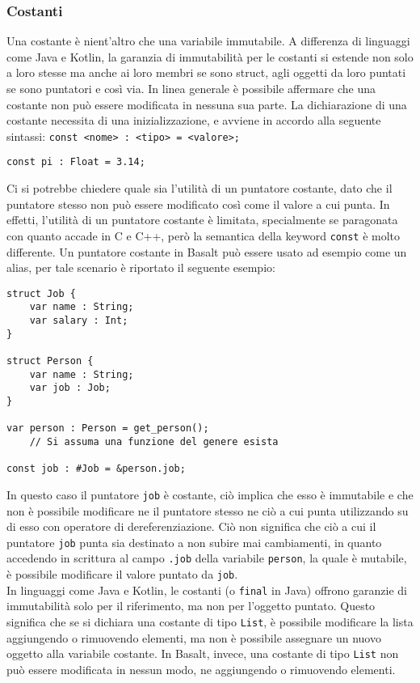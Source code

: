 \subsubsection{Costanti}
Una costante è nient'altro che una variabile immutabile. A differenza di linguaggi come Java e Kotlin, la garanzia di immutabilità per le costanti
si estende non solo a loro stesse ma anche ai loro membri se sono struct, agli oggetti da loro puntati se sono puntatori e così via. In linea generale
è possibile affermare che una costante non può essere modificata in nessuna sua parte. La dichiarazione di una costante necessita di una inizializzazione, 
e avviene in accordo alla seguente sintassi: \texttt{const <nome> : <tipo> = <valore>;}

\vspace{0.5cm}
\begin{lstlisting}[frame=single]
const pi : Float = 3.14;
\end{lstlisting}
\vspace{0.5cm}

Ci si potrebbe chiedere quale sia l'utilità di un puntatore costante, dato che il puntatore stesso non può essere modificato così come il valore a cui punta.
In effetti, l'utilità di un puntatore costante è limitata, specialmente se paragonata con quanto accade in C e C++, però la semantica della keyword \texttt{const}
è molto differente. Un puntatore costante in Basalt può essere usato ad esempio come un alias, per tale scenario è riportato il seguente esempio:

\vspace{0.5cm}
\begin{lstlisting}[frame=single]
struct Job {
    var name : String;
    var salary : Int;
}

struct Person {
    var name : String;
    var job : Job;
}

var person : Person = get_person(); 
    // Si assuma una funzione del genere esista

const job : #Job = &person.job;
\end{lstlisting}
\vspace{0.5cm}

In questo caso il puntatore \texttt{job} è costante, ciò implica che esso è immutabile e che non è possibile modificare ne 
il puntatore stesso ne ciò a cui punta utilizzando su di esso con operatore di dereferenziazione. Ciò non significa che ciò a cui il 
puntatore \texttt{job} punta sia destinato a non subire mai cambiamenti, in quanto accedendo in scrittura al campo \texttt{.job} della 
variabile \texttt{person}, la quale è mutabile, è possibile modificare il valore puntato da \texttt{job}. \\

In linguaggi come Java e Kotlin, le costanti (o \texttt{final} in Java) offrono garanzie di immutabilità solo per il riferimento, 
ma non per l'oggetto puntato. Questo significa che se si dichiara una costante di tipo \texttt{List}, è possibile modificare la lista
aggiungendo o rimuovendo elementi, ma non è possibile assegnare un nuovo oggetto alla variabile costante. In Basalt, invece, una costante
di tipo \texttt{List} non può essere modificata in nessun modo, ne aggiungendo o rimuovendo elementi. \\